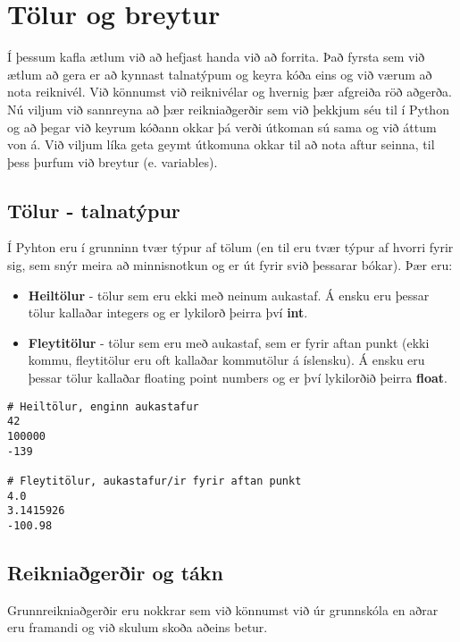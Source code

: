 
\chapter{Tölur og breytur}
Í þessum kafla ætlum við að hefjast handa við að forrita. 
Það fyrsta sem við ætlum að gera er að kynnast talnatýpum og keyra kóða eins og við værum að nota reiknivél. 
Við könnumst við reiknivélar og hvernig þær afgreiða röð aðgerða. 
Nú viljum við sannreyna að þær reikniaðgerðir sem við þekkjum séu til í Python og að þegar við keyrum kóðann okkar þá verði útkoman sú sama og við áttum von á. 
Við viljum líka geta geymt útkomuna okkar til að nota aftur seinna, til þess þurfum við breytur (e. variables).

\section{Tölur - talnatýpur}
Í Pyhton eru í grunninn tvær týpur af tölum (en til eru tvær týpur af hvorri fyrir sig, sem snýr meira að minnisnotkun og er út fyrir svið þessarar bókar). 
Þær eru:

\begin{itemize}
	\item \textbf{Heiltölur} - tölur sem eru ekki með neinum aukastaf. 
	Á ensku eru þessar tölur kallaðar integers og er lykilorð þeirra því \textbf{int}.
	\item \textbf{Fleytitölur} - tölur sem eru með aukastaf, sem er fyrir aftan punkt (ekki kommu, fleytitölur eru oft kallaðar kommutölur á íslensku). 
	Á ensku eru þessar tölur kallaðar floating point numbers og er því lykilorðið þeirra \textbf{float}.
\end{itemize}

\begin{lstlisting}[caption=Heiltölur og fleytitölur]
# Heiltölur, enginn aukastafur
42
100000
-139

# Fleytitölur, aukastafur/ir fyrir aftan punkt
4.0
3.1415926
-100.98
\end{lstlisting}

\section{Reikniaðgerðir og tákn}
Grunnreikniaðgerðir eru nokkrar sem við könnumst við úr grunnskóla en aðrar eru framandi og við skulum skoða aðeins betur.

